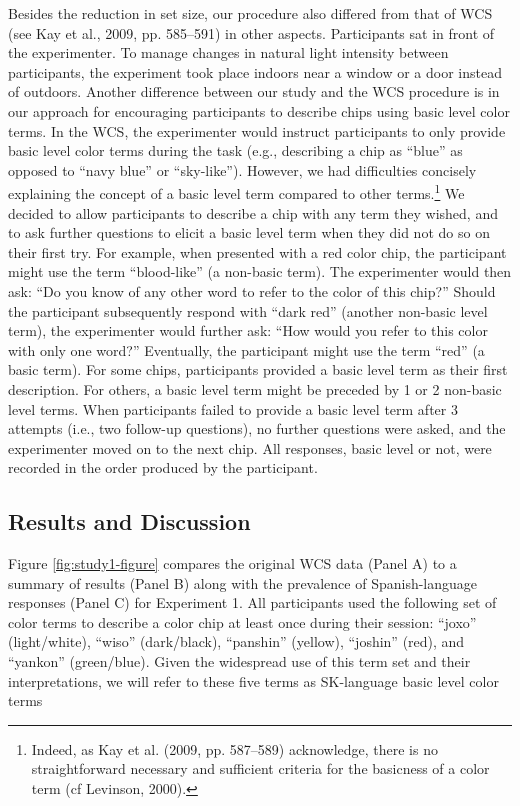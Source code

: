 \documentclass[
  english,
  ,apa7,floatsintext]{apa6}
\begin{document}
Besides the reduction in set size, our procedure also differed from that of WCS (see Kay et al., 2009, pp. 585--591) in other aspects. Participants sat in front of the experimenter. To manage changes in natural light intensity between participants, the experiment took place indoors near a window or a door instead of outdoors. Another difference between our study and the WCS procedure is in our approach for encouraging participants to describe chips using basic level color terms. In the WCS, the experimenter would instruct participants to only provide basic level color terms during the task (e.g., describing a chip as ``blue'' as opposed to ``navy blue'' or ``sky-like''). However, we had difficulties concisely explaining the concept of a basic level term compared to other terms.\footnote{Indeed, as Kay et al. (2009, pp. 587--589) acknowledge, there is no straightforward necessary and sufficient criteria for the basicness of a color term (cf Levinson, 2000).} We decided to allow participants to describe a chip with any term they wished, and to ask further questions to elicit a basic level term when they did not do so on their first try. For example, when presented with a red color chip, the participant might use the term ``blood-like'' (a non-basic term). The experimenter would then ask: ``Do you know of any other word to refer to the color of this chip?'' Should the participant subsequently respond with ``dark red'' (another non-basic level term), the experimenter would further ask: ``How would you refer to this color with only one word?'' Eventually, the participant might use the term ``red'' (a basic term). For some chips, participants provided a basic level term as their first description. For others, a basic level term might be preceded by 1 or 2 non-basic level terms. When participants failed to provide a basic level term after 3 attempts (i.e., two follow-up questions), no further questions were asked, and the experimenter moved on to the next chip. All responses, basic level or not, were recorded in the order produced by the participant.

\hypertarget{results-and-discussion}{%
\subsection{Results and Discussion}\label{results-and-discussion}}

Figure \ref{fig:study1-figure} compares the original WCS data (Panel A) to a summary of results (Panel B) along with the prevalence of Spanish-language responses (Panel C) for Experiment 1. All participants used the following set of color terms to describe a color chip at least once during their session: ``joxo'' (light/white), ``wiso'' (dark/black), ``panshin'' (yellow), ``joshin'' (red), and ``yankon'' (green/blue). Given the widespread use of this term set and their interpretations, we will refer to these five terms as SK-language basic level color terms
\end{document}
